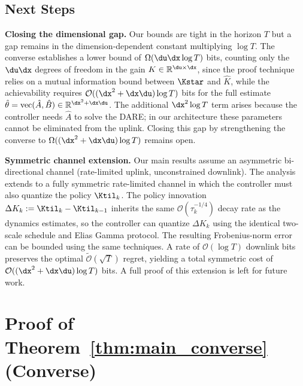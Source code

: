 \documentclass[11pt,journal,onecolumn]{IEEEtran}
\newcommand{\R}{\mathbb{R}}
\begin{document}
\subsection*{Next Steps}

\textbf{Closing the dimensional gap.} Our bounds are tight in the horizon $T$ but a gap remains in the dimension-dependent constant multiplying $\log T$. The converse establishes a lower bound of $\Omega(\du\dx\log T)$ bits, counting only the $\du\dx$ degrees of freedom in the gain $K \in \R^{\du\times\dx}$, since the proof technique relies on a mutual information bound between $\Kstar$ and $\hat K$, while the achievability requires $\mathcal{O}((\dx^2 + \dx\du)\log T)$ bits for the full estimate $\hat\theta = \mathrm{vec}(\hat A, \hat B) \in \R^{\dx^2 + \dx\du}$. The additional $\dx^2 \log T$ term arises because the controller needs $\hat A$ to solve the DARE; in our architecture these parameters cannot be eliminated from the uplink. Closing this gap by strengthening the converse to $\Omega((\dx^2 + \dx\du)\log T)$ remains open.

\textbf{Symmetric channel extension.} Our main results assume an asymmetric bi-directional channel (rate-limited uplink, unconstrained downlink). The analysis extends to a fully symmetric rate-limited channel in which the controller must also quantize the policy $\Ktil_k$. The policy innovation $\Delta K_k := \Ktil_k - \Ktil_{k-1}$ inherits the same $\mathcal{O}(\tau_k^{-1/4})$ decay rate as the dynamics estimates, so the controller can quantize $\Delta K_k$ using the identical two-scale schedule and Elias Gamma protocol. The resulting Frobenius-norm error can be bounded using the same techniques. A rate of $\mathcal{O}(\log T)$ downlink bits preserves the optimal $\tilde{\mathcal{O}}(\sqrt{T})$ regret, yielding a total symmetric cost of $\mathcal{O}((\dx^2 + \dx\du)\log T)$ bits. A full proof of this extension is left for future work.





\newpage
\appendices
\section{Proof of Theorem~\ref{thm:main_converse} (Converse)}
\label{app:converse}
\end{document}
